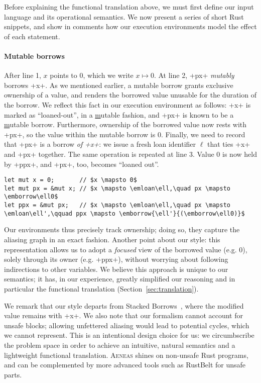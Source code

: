 \documentclass[acmsmall,screen]{acmart}
\newcommand{\sref}[1]{Section~\ref{sec:#1}}
\newcommand{\aeneas}{\textsc{Aeneas}\xspace}
\newcommand\emborrow[2]{\ensuremath{\mathsf{borrow}^m\,#1\;#2}}
\newcommand\emloan[1]{\ensuremath{\mathsf{loan}^m\,#1}}
\newcommand\myparagraph[1]{\emph{#1}.\ }
\let\myparagraph\paragraph
\begin{document}
Before explaining the functional translation above,
we must first define our
input language and its operational semantics. We now present a series of short
Rust snippets, and show in comments how our execution environments model the
effect of each statement.

\myparagraph{Mutable borrows}
After line 1, $x$ points to $0$, which we write $x \mapsto 0$. At line 2, \li+px+ \emph{mutably} borrows \li+x+. As we
mentioned earlier, a mutable borrow grants exclusive ownership of a value, and
renders the borrowed value unusable for the duration of the borrow. We reflect this
fact in our execution environment as follows: \li+x+ is marked as
``loaned-out'', in a \underline{m}utable fashion, and \li+px+ is known to be a
\underline{m}utable borrow. Furthermore, ownership of the borrowed value now
rests with \li+px+, so the value within the mutable borrow is 0. Finally, we
need to record that \li+px+ is a borrow \emph{of \li+x+}: we issue a fresh loan
identifier $\ell$ that ties \li+x+ and \li+px+ together.
The same operation is repeated at line 3. Value 0 is now held by \li+ppx+, and
\li+px+, too, becomes ``loaned out''.
\begin{verbatim}
let mut x = 0;       // $x \mapsto 0$
let mut px = &mut x; // $x \mapsto \emloan\ell,\quad px \mapsto \emborrow\ell0$
let ppx = &mut px;   // $x \mapsto \emloan\ell,\quad px \mapsto \emloan\ell',\qquad ppx \mapsto \emborrow{\ell'}{(\emborrow\ell0)}$
\end{verbatim}
Our environments thus precisely track ownership; doing so, they capture the aliasing
graph in an exact fashion. Another point about our style:
this representation allows us to adopt a \emph{focused} view of the borrowed
value (e.g. 0), solely
through its owner (e.g. \li+ppx+), without worrying about following indirections
to other variables.
We believe this
approach is unique to our semantics; it has, in our experience, greatly
simplified our reasoning and in particular the functional translation
(\sref{translation}).

We remark that our style
departs from Stacked Borrows~\cite{jung2019stacked}, where the modified value
remains with \li+x+. We also note that our formalism cannot account for unsafe
blocks; allowing unfettered aliasing would lead to potential cycles, which we
cannot represent. This is an intentional design choice for us: we circumbscribe
the problem space in order to achieve an intuitive, natural semantics and a
lightweight functional translation. \aeneas shines on non-unsafe Rust programs,
and can be complemented by more advanced tools such as RustBelt for unsafe
parts.
\end{document}

